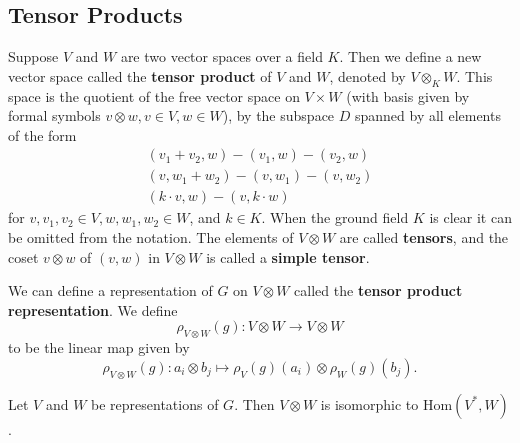 \subsection{Tensor Products}
\begin{frame}
\begin{definition}
Suppose $V$ and $W$ are two vector spaces over a field $K$. Then we define a new vector space called the \textbf{tensor product} of $V$ and $W$, denoted by $V \otimes_{K} W$.  This space is the quotient of the free vector space on $V \times W$ (with basis given by formal symbols $v \otimes w, v\in V, w \in W$), by the subspace $D$ spanned by all elements of the form
\begin{align*}
(v_1 + v_2, w) - (v_1 , w) - (v_2 , w) \\
(v , w_1 + w_2) - (v , w_1) - (v , w_2) \\
(k \cdot v , w) -( v , k \cdot w)
\end{align*}
for $v, v_1, v_2 \in V, w, w_1, w_2 \in W$, and $k \in K$. When the ground field $K$ is clear it can be omitted from the notation.  The elements of $V \otimes W$ are called \textbf{tensors}, and the coset $v \otimes w$ of $(v,w)$ in $V \otimes W$ is called a \textbf{simple tensor}.
\end{definition}
\end{frame}

\begin{frame}
\begin{definition}
We can define a representation of $G$ on $V \otimes W$ called the \textbf{tensor product representation}. We define
\[ \rho_{V \otimes W} (g) \colon V \otimes W \to V \otimes W \]
to be the linear map given by
\[ \rho_{V \otimes W} (g) \colon a_i \otimes b_j \mapsto \rho_V (g) (a_i) \otimes \rho_W (g) (b_j).\]
\end{definition}
\begin{proposition}
Let $V$ and $W$ be representations of $G$.  Then $V \otimes W$ is isomorphic to $\text{Hom}(V^{*},W)$.
\end{proposition}
\end{frame}

